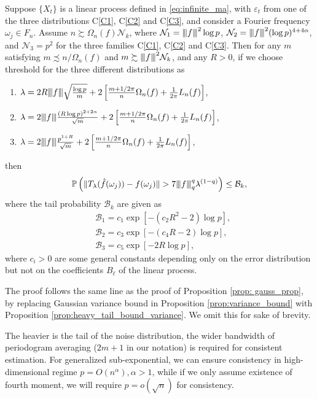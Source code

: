 \begin{prop}
\label{prop: linear_prop}
Suppose $\{X_t\}$ is a linear process defined in \eqref{eq:infinite_ma}, with $\varepsilon_t$ from one of the three distributions C\ref{C1}, C\ref{C2} and C\ref{C3}, and consider a Fourier frequency $\omega_j \in F_n$.
Assume $n \succsim \Omega_n(f) \mathcal{N}_k$, where $\mathcal{N}_1 = {\left\vert\kern-0.25ex\left\vert\kern-0.25ex\left\vert f \right\vert\kern-0.25ex\right\vert\kern-0.25ex\right\vert}^2 \log p$, $\mathcal{N}_2 = {\left\vert\kern-0.25ex\left\vert\kern-0.25ex\left\vert f \right\vert\kern-0.25ex\right\vert\kern-0.25ex\right\vert}^2 (\log p)^{4+4\alpha}$, and $\mathcal{N}_3 = p^{2}$ for the three families C\ref{C1}, C\ref{C2} and C\ref{C3}. Then for any $m $ satisfying $m \precsim n/ \Omega_n(f)$ and $m \succsim {\left\vert\kern-0.25ex\left\vert\kern-0.25ex\left\vert f \right\vert\kern-0.25ex\right\vert\kern-0.25ex\right\vert}^2 \mathcal{N}_k$, and any $R > 0$, 
if we choose threshold for the three different distributions as 
\begin{enumerate}[(C1)]
    \item $\lambda = 2R{\left\vert\kern-0.25ex\left\vert\kern-0.25ex\left\vert f \right\vert\kern-0.25ex\right\vert\kern-0.25ex\right\vert}\sqrt{\frac{\log p}{m}} + 2\left[\frac{m+1/2\pi}{n}\Omega_n(f)+\frac{1}{2\pi}L_n(f)\right]$,
    \item $\lambda = 2{\left\vert\kern-0.25ex\left\vert\kern-0.25ex\left\vert f \right\vert\kern-0.25ex\right\vert\kern-0.25ex\right\vert}\frac{(R\log p)^{2+2\alpha}}{\sqrt{m}} + 2\left[\frac{m+1/2\pi}{n}\Omega_n(f)+\frac{1}{2\pi}L_n(f)\right]$,
    \item $\lambda = 2{\left\vert\kern-0.25ex\left\vert\kern-0.25ex\left\vert f \right\vert\kern-0.25ex\right\vert\kern-0.25ex\right\vert}\frac{p^{1+R}}{\sqrt{m}} + 2\left[\frac{m+1/2\pi}{n}\Omega_n(f)+\frac{1}{2\pi}L_n(f)\right]$,
\end{enumerate}
then 
\begin{equation}
\mathbb{P} \left( \|T_{\lambda}(\hat{f}(\omega_j))-f(\omega_j)\| >  7{\left\vert\kern-0.25ex\left\vert\kern-0.25ex\left\vert f \right\vert\kern-0.25ex\right\vert\kern-0.25ex\right\vert}_q^q \lambda^{(1-q)}\right) \le \mathcal{B}_k, \nonumber
\end{equation}
where the tail probability $\mathcal{B}_k$ are given as 
\begin{equation}
\begin{aligned}
& \mathcal{B}_1 =  c_1 \exp\left[-(c_2 R^2-2)\log p\right], \\
& \mathcal{B}_2 =  c_3 \exp\left[-(c_4 R-2)\log p\right], \\
& \mathcal{B}_3 = c_5 \exp \left[ - 2R \log p \right],
\end{aligned}
\end{equation}
where $c_i > 0$ are some general constants depending only on the error distribution but not on the coefficients $B_\ell$ of the linear process. 
\end{prop}






The proof follows the same line as the proof of Proposition \ref{prop: gauss_prop}, by replacing Gaussian variance bound in Proposition \ref{prop:variance_bound} with Proposition \ref{prop:heavy_tail_bound_variance}. We omit this for sake of brevity.
\begin{remark}
The heavier is the tail of the noise distribution, the wider bandwidth of periodogram averaging ($2m+1$ in our notation) is required for consistent estimation. For generalized sub-exponential, we can ensure consistency in high-dimensional regime  $p=O(n^\alpha), \alpha>1$, while if we only assume existence of fourth moment, we will require $p=o(\sqrt{n})$ for consistency. 
\end{remark}





